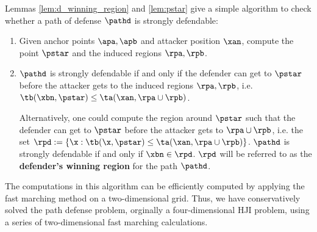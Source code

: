 Lemmas \ref{lem:d_winning_region} and \ref{lem:pstar} give a simple algorithm to check whether a path of defense $\pathd$ is strongly defendable:
\begin{enumerate}
\item Given anchor points $\apa, \apb$ and attacker position $\xan$, compute the point $\pstar$ and the induced regions $\rpa,\rpb$.
\item $\pathd$ is strongly defendable if and only if the defender can get to $\pstar$ before the attacker gets to the induced regions $\rpa,\rpb$, i.e. $\tb(\xbn,\pstar) \le \ta(\xan,\rpa \cup \rpb)$.

Alternatively, one could compute the region around $\pstar$ such that the defender can get to $\pstar$ before the attacker gets to $\rpa\cup\rpb$, i.e. the set $\rpd := \left\{\x: \tb(\x,\pstar) \le \ta(\xan,\rpa \cup \rpb)\right\}$. $\pathd$ is strongly defendable if and only if $\xbn \in \rpd$. $\rpd$ will be referred to as the \textbf{defender's winning region} for the path $\pathd$.
\end{enumerate}

The computations in this algorithm can be efficiently computed by applying the fast marching method \cite{} on a two-dimensional grid. Thus, we have conservatively solved the path defense problem, orginally a four-dimensional HJI problem, using a series of two-dimensional fast marching calculations. 

